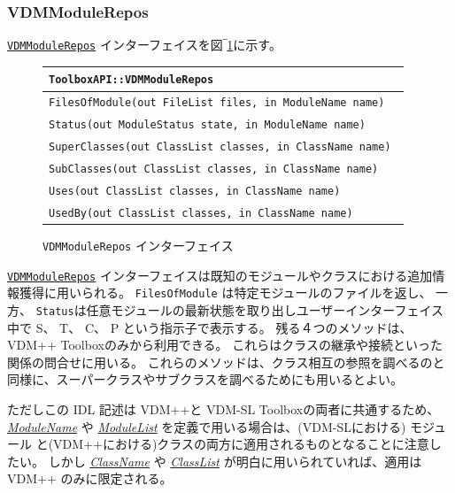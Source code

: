 \documentclass[\pformat,12pt]{jarticle}
\newcommand{\ModuleName}{\hyperlink{type.ModuleName}{ModuleName}}
\newcommand{\ModuleList}{\hyperlink{type.ModuleList}{ModuleList}}
\newcommand{\ClassName}{\hyperlink{type.ClassName}{ClassName}}
\newcommand{\ClassList}{\hyperlink{type.ClassList}{ClassList}}
\newcommand{\VDMModuleRepos}{\hyperlink{interface.VDMModuleRepos}{VDMModuleRepos}}
\begin{document}
\subsubsection{VDMModuleRepos}

{\tt \VDMModuleRepos} インターフェイスを図‾\ref{fig:VDMModuleRepos}に示す。


\begin{figure}[tbh]
\begin{center}
\begin{tabular}{|l|}
\hline
{\tt ToolboxAPI::VDMModuleRepos } \\
\hline
{\tt FilesOfModule(out FileList files, in ModuleName name) } \\
{\tt Status(out ModuleStatus state, in ModuleName name) } \\
{\tt SuperClasses(out ClassList classes, in ClassName name) } \\
{\tt SubClasses(out ClassList classes, in ClassName name) } \\
{\tt Uses(out ClassList classes, in ClassName name) } \\
{\tt UsedBy(out ClassList classes, in ClassName name) } \\
\hline
\end{tabular}
\caption{{\tt VDMModuleRepos} インターフェイス}\label{fig:VDMModuleRepos}
\end{center}
\end{figure}

 {\tt \VDMModuleRepos} インターフェイスは既知のモジュールやクラスにおける追加情報獲得に用いられる。
{\tt FilesOfModule} は特定モジュールのファイルを返し、 一方、 {\tt Status}は任意モジュールの最新状態を取り出しユーザーインターフェイス中で S、 T、 C、 P という指示子で表示する。 
残る４つのメソッドは、VDM++ Toolboxのみから利用できる。
これらはクラスの継承や接続といった関係の問合せに用いる。
これらのメソッドは、クラス相互の参照を調べるのと同様に、スーパークラスやサブクラスを調べるためにも用いるとよい。

ただしこの IDL 記述は VDM++と VDM-SL Toolboxの両者に共通するため、 {\em \ModuleName} や {\em \ModuleList} を定義で用いる場合は、(VDM-SLにおける) モジュール と(VDM++における)クラスの両方に適用されるものとなることに注意したい。
しかし {\em \ClassName} や {\em \ClassList} が明白に用いられていれば、適用は VDM++ のみに限定される。
\end{document}
